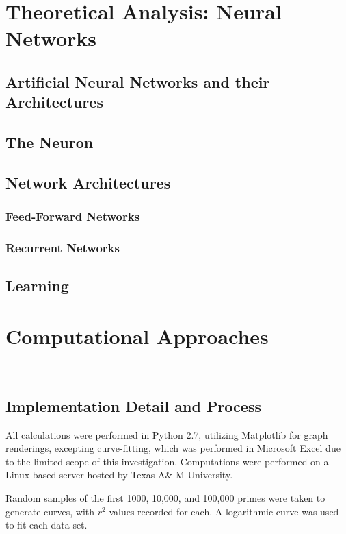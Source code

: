 \documentclass[11pt]{article}
\begin{document}
\section{Theoretical Analysis: Neural Networks}
\subsection{Artificial Neural Networks and their Architectures}

\subsection{The Neuron}


\subsection{Network Architectures}

\subsubsection{Feed-Forward Networks}

\subsubsection{Recurrent Networks}

\subsection{Learning}
 




\section{Computational Approaches}$ $
\subsection{Implementation Detail and Process}
All calculations were performed in Python 2.7, utilizing Matplotlib for graph renderings, excepting curve-fitting, which was performed in Microsoft Excel due to the limited scope of this investigation. Computations were performed on a Linux-based server hosted by Texas A\& M University. 

 Random samples of the first 1000, 10,000, and 100,000 primes were taken to generate curves, with $r^{2}$ values recorded for each. A logarithmic curve was used to fit each data set.
\end{document}
